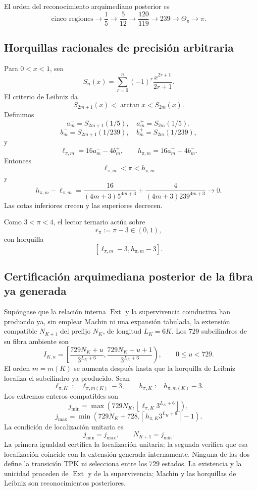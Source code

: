 El orden del reconocimiento arquimediano posterior es
\[
 \text{cinco regiones}
 \to\frac15
 \to\frac5{12}
 \to\frac{120}{119}
 \to239
 \to\Theta_\pi
 \to\pi.
\]

\subsection{Horquillas racionales de precisión arbitraria}

Para \(0<x<1\), sea
\[
 S_n(x)=\sum_{r=0}^{n}(-1)^r\frac{x^{2r+1}}{2r+1}.
\]
El criterio de Leibniz da
\[
 S_{2m+1}(x)<\arctan x<S_{2m}(x).
\]
Definimos
\[
 a_m^-=S_{2m+1}(1/5),\quad a_m^+=S_{2m}(1/5),
\]
\[
 b_m^-=S_{2m+1}(1/239),\quad b_m^+=S_{2m}(1/239),
\]
y
\begin{equation}
 \ell_{\pi,m}=16a_m^- -4b_m^+,
 \qquad
 h_{\pi,m}=16a_m^+ -4b_m^-.
 \label{p12-83-c9-s1:eq:horquilla-pi-autonoma}
\end{equation}
Entonces
\[
 \ell_{\pi,m}<\pi<h_{\pi,m}
\]
y
\begin{equation}
 h_{\pi,m}-\ell_{\pi,m}
 =
 \frac{16}{(4m+3)5^{4m+3}}
 +\frac{4}{(4m+3)239^{4m+3}}
 \longrightarrow0.
 \label{p12-83-c9-s1:eq:anchura-horquilla-pi}
\end{equation}
Las cotas inferiores crecen y las superiores decrecen.

Como \(3<\pi<4\), el lector ternario actúa sobre
\[
 r_\pi:=\pi-3\in(0,1),
\]
con horquilla
\[
 [\ell_{\pi,m}-3,h_{\pi,m}-3].
\]

\subsection{Certificación arquimediana posterior de la fibra ya generada}

Supóngase que la relación interna \(\operatorname{Ext}\) y la supervivencia
coinductiva han producido ya, sin emplear Machin ni una expansión tabulada,
la extensión compatible \(N_{K+1}\) del prefijo \(N_K\), de longitud
\(L_K=6K\). Los \(729\) subcilindros de su fibra ambiente son
\[
 I_{K,u}=
 \left[
 \frac{729N_K+u}{3^{L_K+6}},
 \frac{729N_K+u+1}{3^{L_K+6}}
 \right),
 \qquad0\leq u<729.
\]
El orden \(m=m(K)\) se aumenta después hasta que la horquilla de Leibniz
localiza el subcilindro ya producido. Sean
\[
 \ell_{\pi,K}:=\ell_{\pi,m(K)}-3,
 \qquad
 h_{\pi,K}:=h_{\pi,m(K)}-3.
\]
Los extremos enteros compatibles son
\[
 j_{\min}=
 \max\!\left(
 729N_K,\left\lfloor
 \ell_{\pi,K}3^{L_K+6}\right\rfloor
 \right),
\]
\[
 j_{\max}=
 \min\!\left(
 729N_K+728,\left\lceil
 h_{\pi,K}3^{L_K+6}\right\rceil-1
 \right).
\]
La condición de localización unitaria es
\begin{equation}
 \boxed{j_{\min}=j_{\max},\qquad N_{K+1}=j_{\min}.}
 \label{p12-83-c9-s1:eq:seleccion-unitaria-subcilindro-pi}
\end{equation}
La primera igualdad certifica la localización unitaria; la segunda verifica
que esa localización coincide con la extensión generada internamente. Ninguna
de las dos define la transición TPK ni selecciona entre los \(729\) estados.
La existencia y la unicidad proceden de \(\operatorname{Ext}\) y de la
supervivencia; Machin y las horquillas de Leibniz son reconocimientos
posteriores.

